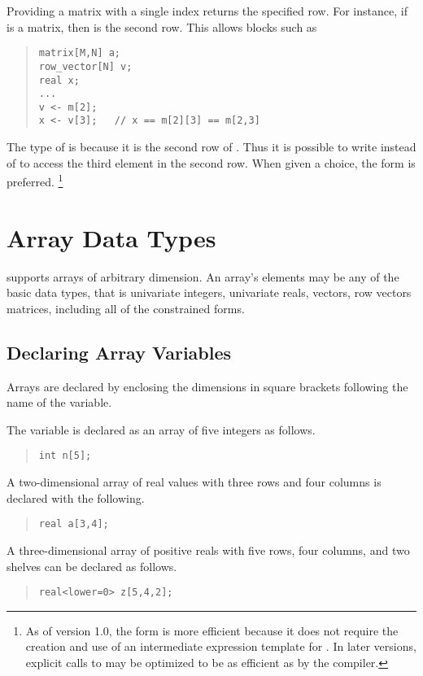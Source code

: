 Providing a matrix with a single index returns the specified row.  For
instance, if  is a matrix, then  is the second row.
This allows \Stan blocks such as
%
\begin{quote}
\begin{Verbatim} 
matrix[M,N] a;    
row_vector[N] v;    
real x;
...
v <- m[2];   
x <- v[3];   // x == m[2][3] == m[2,3]
\end{Verbatim}
\end{quote}
% 
The type of  is  because it is the second
row of .  Thus it is possible to write  instead
of  to access the third element in the second row.  When
given a choice, the form  is preferred.%
%
\footnote{As of \Stan version 1.0, the form
   is more efficient because it does not require the
  creation and use of an intermediate expression template for
  .  In later versions, explicit calls to 
  may be optimized to be as efficient as  by the \Stan
  compiler.\label{array-index-style.footnote}}


\section{Array Data Types}

\Stan supports arrays of arbitrary dimension.  An array's elements may
be any of the basic data types, that is univariate integers,
univariate reals, vectors, row vectors matrices, including all of the
constrained forms.

\subsection{Declaring Array Variables}

Arrays are declared by enclosing the dimensions in square brackets
following the name of the variable.

The variable  is declared as an array of five integers as follows.
%
\begin{quote}
\begin{Verbatim}  
int n[5];
\end{Verbatim}
\end{quote}
% 
A two-dimensional array of real values with three rows and four columns is
declared with the following.
%
\begin{quote}
\begin{Verbatim}  
real a[3,4];
\end{Verbatim}
\end{quote}
% 
A three-dimensional array  of positive reals with five rows, four
columns, and two shelves can be declared as follows.
%
\begin{quote}
\begin{Verbatim} 
real<lower=0> z[5,4,2];
\end{Verbatim}
\end{quote}
%

